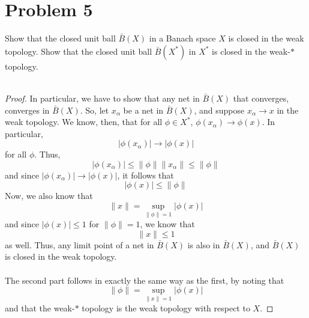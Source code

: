 \documentclass[fontsize=11pt]{scrartcl} %
\numberwithin{equation}{section} %
\numberwithin{figure}{section} %
\numberwithin{table}{section} %
\begin{document}
\section*{Problem 5}
Show that the closed unit ball $\bar{B}(X)$ in a Banach space $X$ is closed
in the weak topology. Show that the closed unit ball $\bar{B}(X^*)$ in $X^*$ is
closed in the weak-$*$ topology.
\\
\\
\begin{proof}
    In particular, we have to show that any net in $\bar{B}(X)$ that converges,
    converges in $\bar{B}(X)$. So, let $x_{\alpha}$ be a net in $\bar{B}(X)$,
    and suppose $x_{\alpha}\to x$ in the weak topology. We know, then, that for
    all $\phi\in X^*$, $\phi(x_{\alpha})\to\phi(x)$. In particular,
\[
    |\phi(x_{\alpha})|\to|\phi(x)|
\]
    for all $\phi$. Thus,
    \[
        |\phi(x_{\alpha})|\leq\|\phi\|\|x_{\alpha}\|\leq \|\phi\|
    \]
    and since $|\phi(x_{\alpha})|\to|\phi(x)|$, it follows that
    \[
        |\phi(x)|\leq \|\phi\|
    \]
    Now, we also know that
    \[
        \|x\| = \sup_{\|\phi\| = 1}|\phi(x)|
    \]
    and since $|\phi(x)|\leq 1$ for $\|\phi\|=1$, we know that
    \[
    \|x\|\leq 1
    \]
    as well. Thus, any limit point of a net in $\bar{B}(X)$ is also in
    $\bar{B}(X)$, and $\bar{B}(X)$ is closed in the weak topology.
    \\
    \\
    The second part follows in exactly the same way as the first, by noting that
    \[
        \|\phi\| = \sup_{\|x\|=1}|\phi(x)|
    \]
    and that the weak-$*$ topology is the weak topology with respect to $X$.
\end{proof}
\end{document}

